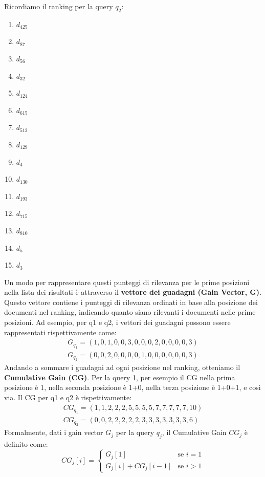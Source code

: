 \documentclass{report}
\begin{document}
	Ricordiamo il ranking per la query $q_2$:
	\begin{multicols}{3}
		\begin{enumerate}
			\item \( d_{425} \)
			\item \( d_{87} \)
			\item \( d_{56} \)
			\item \( d_{32} \)
			\item \( d_{124} \)
			\item \( d_{615} \)
			\item \( d_{512} \)
			\item \( d_{129} \)
			\item \( d_{4} \)
			\item \( d_{130} \)
			\item \( d_{193} \)
			\item \( d_{715} \)
			\item \( d_{810} \)
			\item \( d_{5} \)
			\item \( d_{3} \)
		\end{enumerate}
		\end{multicols}
	Un modo per rappresentare questi punteggi di rilevanza per le prime posizioni nella lista dei risultati è attraverso il \textbf{vettore dei guadagni (Gain Vector, G)}. Questo vettore contiene i punteggi di rilevanza ordinati in base alla posizione dei documenti nel ranking, indicando quanto siano rilevanti i documenti nelle prime posizioni. Ad esempio, per q1 e q2, i vettori dei guadagni possono essere rappresentati rispettivamente come:
	\[
		\begin{array}{l}
			G_{q_1} = (1,0,1,0,0,3,0,0,0,2,0,0,0,0,3)\\
			G_{q_2} = (0,0,2,0,0,0,0,1,0,0,0,0,0,0,3)
		\end{array}
	\]
	Andando a sommare i guadagni ad ogni posizione nel ranking, otteniamo il \textbf{Cumulative Gain (CG)}. Per la query 1, per esempio il CG nella prima posizione è 1, nella seconda posizione è 1+0, nella terza posizione è 1+0+1, e così via. Il CG per q1 e q2 è rispettivamente:
	\[
		\begin{array}{l}
			CG_{q_1} = (1,1,2,2,2,5,5,5,5,7,7,7,7,7,10)\\
			CG_{q_2} = (0,0,2,2,2,2,2,3,3,3,3,3,3,3,6)
		\end{array}
	\]
	Formalmente, dati i gain vector $G_j$ per la query $q_j$, il Cumulative Gain $CG_j$ è definito come:
	\begin{equation}
		CG_j[i] =
		\begin{cases}
		  G_j[1] & \text{se } i = 1\\
		  G_j[i] + CG_j[i-1] & \text{se } i > 1
		\end{cases}
	\end{equation} 
\end{document}
